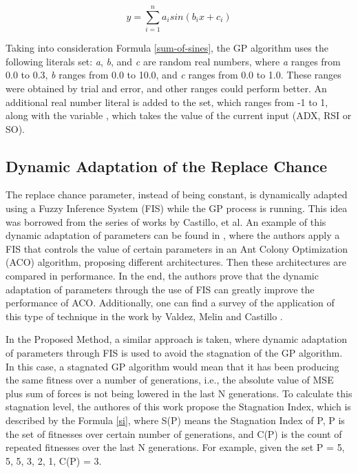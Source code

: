 \documentclass[12pt,journal,draftcls,onecolumn]{IEEEtran}
\begin{document}
\begin{equation} \label{sum-of-sines}
  y = \sum_{i=1}^{n} a_{i} sin(b_{i}x + c_{i})
\end{equation}

Taking into consideration Formula \ref{sum-of-sines}, the GP algorithm uses the following literals set: \textit{a}, \textit{b}, and \textit{c} are random real numbers, where \textit{a} ranges from 0.0 to 0.3, \textit{b} ranges from 0.0 to 10.0, and \textit{c} ranges from 0.0 to 1.0. These ranges were obtained by trial and error, and other ranges could perform better. An additional real number literal is added to the set, which ranges from -1 to 1, along with the variable , which takes the value of the current input (ADX, RSI or SO).

\subsection{Dynamic Adaptation of the Replace Chance}
\label{dynamic-adaptation-of-the-replace-chance}

The replace chance parameter, instead of being constant, is dynamically adapted using a Fuzzy Inference System (FIS) while the GP process is running. This idea was borrowed from the series of works by Castillo, et al. An example of this dynamic adaptation of parameters can be found in \cite{castillo2015new}, where the authors apply a FIS that controls the value of certain parameters in an Ant Colony Optimization (ACO) algorithm, proposing different architectures. Then these architectures are compared in performance. In the end, the authors prove that the dynamic adaptation of parameters through the use of FIS can greatly improve the performance of ACO. Additionally, one can find a survey of the application of this type of technique in the work by Valdez, Melin and Castillo \cite{valdez2014survey}.

In the Proposed Method, a similar approach is taken, where dynamic adaptation of parameters through FIS is used to avoid the stagnation of the GP algorithm. In this case, a stagnated GP algorithm would mean that it has been producing the same fitness over a number of generations, i.e., the absolute value of MSE plus sum of forces is not being lowered in the last N generations. To calculate this stagnation level, the authores of this work propose the Stagnation Index, which is described by the Formula \ref{si}, where S(P) means the Stagnation Index of P, P is the set of fitnesses over certain number of generations, and C(P) is the count of repeated fitnesses over the last N generations. For example, given the set P = {5, 5, 5, 3, 2, 1}, C(P) = 3.
\end{document}
